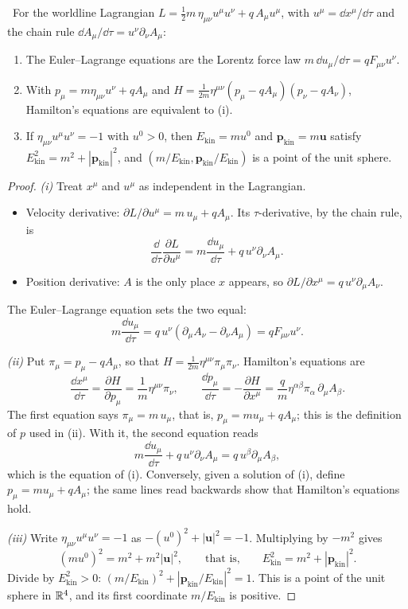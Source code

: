 \begin{theorem}\label{thm:particle}\ver\
For the worldline Lagrangian $L=\frac12m\,\eta_{\mu\nu}u^\mu u^\nu+q\,A_\mu u^\mu$, with $u^\mu=\dd x^\mu/\dd\tau$ and the chain rule $\dd A_\mu/\dd\tau=u^\nu\partial_\nu A_\mu$:
\begin{enumerate}[label=(\roman*)]
\item The Euler--Lagrange equations are the Lorentz force law $m\,\dd u_\mu/\dd\tau=qF_{\mu\nu}u^\nu$.
\item With $p_\mu=m\eta_{\mu\nu}u^\nu+qA_\mu$ and $H=\frac1{2m}\eta^{\mu\nu}(p_\mu-qA_\mu)(p_\nu-qA_\nu)$, Hamilton's equations are equivalent to (i).
\item If $\eta_{\mu\nu}u^\mu u^\nu=-1$ with $u^0>0$, then $E_{\mathrm{kin}}=mu^0$ and $\mathbf p_{\mathrm{kin}}=m\mathbf u$ satisfy $E_{\mathrm{kin}}^2=m^2+|\mathbf p_{\mathrm{kin}}|^2$, and $(m/E_{\mathrm{kin}},\mathbf p_{\mathrm{kin}}/E_{\mathrm{kin}})$ is a point of the unit sphere.
\end{enumerate}
\end{theorem}
\begin{proof}
\emph{(i)} Treat $x^\mu$ and $u^\mu$ as independent in the Lagrangian.
\begin{itemize}[nosep]
\item Velocity derivative: $\partial L/\partial u^\mu=m\,u_\mu+qA_\mu$. Its $\tau$-derivative, by the chain rule, is
\[
\frac{\dd}{\dd\tau}\frac{\partial L}{\partial u^\mu}=m\frac{\dd u_\mu}{\dd\tau}+q\,u^\nu\partial_\nu A_\mu .
\]
\item Position derivative: $A$ is the only place $x$ appears, so $\partial L/\partial x^\mu=q\,u^\nu\partial_\mu A_\nu$.
\end{itemize}
The Euler--Lagrange equation sets the two equal:
\[
m\frac{\dd u_\mu}{\dd\tau}=q\,u^\nu(\partial_\mu A_\nu-\partial_\nu A_\mu)=qF_{\mu\nu}u^\nu .
\]

\emph{(ii)} Put $\pi_\mu=p_\mu-qA_\mu$, so that $H=\frac1{2m}\eta^{\mu\nu}\pi_\mu\pi_\nu$. Hamilton's equations are
\[
\frac{\dd x^\mu}{\dd\tau}=\frac{\partial H}{\partial p_\mu}=\frac1m\eta^{\mu\nu}\pi_\nu,\qquad
\frac{\dd p_\mu}{\dd\tau}=-\frac{\partial H}{\partial x^\mu}=\frac qm\eta^{\alpha\beta}\pi_\alpha\,\partial_\mu A_\beta .
\]
The first equation says $\pi_\mu=m\,u_\mu$, that is, $p_\mu=m u_\mu+qA_\mu$; this is the definition of $p$ used in (ii). With it, the second equation reads
\[
m\frac{\dd u_\mu}{\dd\tau}+q\,u^\nu\partial_\nu A_\mu=q\,u^\beta\partial_\mu A_\beta ,
\]
which is the equation of (i). Conversely, given a solution of (i), define $p_\mu=mu_\mu+qA_\mu$; the same lines read backwards show that Hamilton's equations hold.

\emph{(iii)} Write $\eta_{\mu\nu}u^\mu u^\nu=-1$ as $-(u^0)^2+|\mathbf u|^2=-1$. Multiplying by $-m^2$ gives
\[
(mu^0)^2=m^2+m^2|\mathbf u|^2,\qquad\text{that is,}\qquad E_{\mathrm{kin}}^2=m^2+|\mathbf p_{\mathrm{kin}}|^2 .
\]
Divide by $E_{\mathrm{kin}}^2>0$: $(m/E_{\mathrm{kin}})^2+|\mathbf p_{\mathrm{kin}}/E_{\mathrm{kin}}|^2=1$. This is a point of the unit sphere in $\mathbb{R}^4$, and its first coordinate $m/E_{\mathrm{kin}}$ is positive.
\end{proof}


